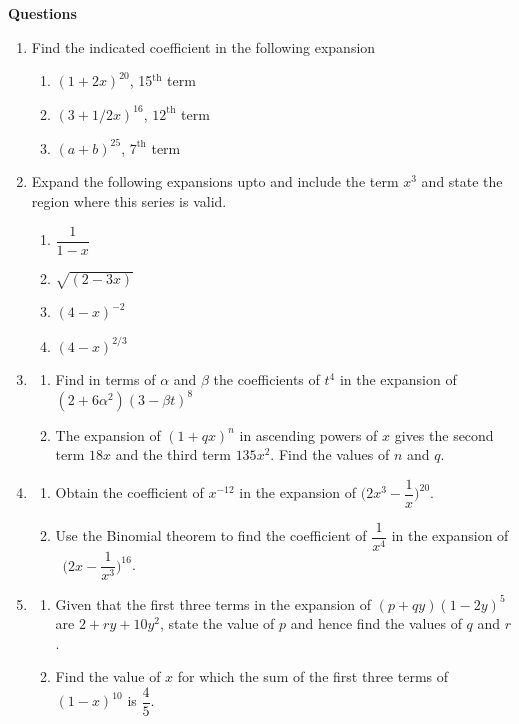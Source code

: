 \documentclass[11pt,a4paper]{article}
\begin{document}
\pagebreak
\textbf{Questions}
\begin{enumerate}
\item Find the indicated coefficient in the following expansion
\begin{enumerate}
     \item $(1+2x)^{20}$, 15$^{\text{th}}$ term
     \item $(3+1/2x)^{16}$, $12^{\text{th}}$ term
     \item $(a+b)^{25}$, $7^{\text{th}}$ term\\
\end{enumerate}

\item Expand the following expansions upto and include the term $x^3$ and state the region where this series is valid.
\begin{enumerate}
     \item $\dfrac{1}{1-x}$
     \item $\sqrt{(2-3x)}$
     \item $(4-x)^{-2}$
     \item $(4-x)^{2/3}$\\
\end{enumerate}

\item
\begin{enumerate}
     \item Find in terms of $\alpha$ and $\beta$ the coefficients of $t^4$ in the expansion of\\ $(2+6\alpha^2)(3-\beta t)^8$
     \item The expansion of $(1+qx)^n$ in ascending powers of $x$ gives the second term $18x$ and the third term $135x^2$. Find the values of $n$ and $q$.\\
\end{enumerate}

\item
\begin{enumerate}
      \item Obtain the coefficient of $x^{-12}$ in the expansion of $\bigg(2x^3-\dfrac{1}{x}\bigg)^{20}$.
      \item Use the Binomial theorem to find the coefficient of $\dfrac{1}{x^4}$ in the expansion of\\\ $\bigg(2x-\dfrac{1}{x^3}\bigg)^{16}$.\\
\end{enumerate}

\item
\begin{enumerate}
     \item Given that the first three terms in the expansion of $(p+qy)(1-2y)^5$ are $2+ry+10y^2$, state the value of $p$ and hence find the values of $q$ and $r$.
     \item Find the value of $x$ for which the sum of the first three terms of $(1-x)^{10}$ is $\dfrac{4}{5}$.\\     
\end{enumerate}


\end{enumerate}
\end{document}

